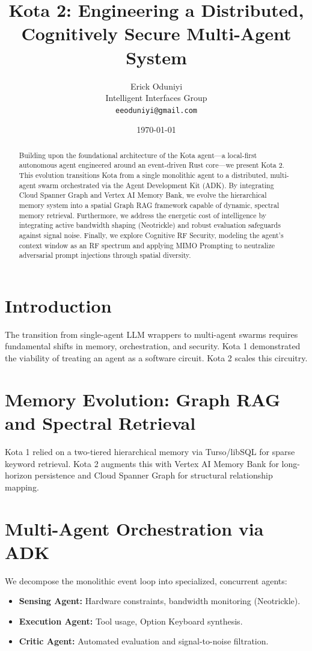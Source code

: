 \documentclass[11pt,a4paper]{article}
\title{\textbf{Kota 2: Engineering a Distributed, Cognitively Secure Multi-Agent System}}
\author{Erick Oduniyi \\ Intelligent Interfaces Group \\ \texttt{eeoduniyi@gmail.com}}
\date{\today}
\begin{document}
\maketitle

\begin{abstract}
Building upon the foundational architecture of the Kota agent---a local-first autonomous agent engineered around an event-driven Rust core---we present Kota 2. This evolution transitions Kota from a single monolithic agent to a distributed, multi-agent swarm orchestrated via the Agent Development Kit (ADK). By integrating Cloud Spanner Graph and Vertex AI Memory Bank, we evolve the hierarchical memory system into a spatial Graph RAG framework capable of dynamic, spectral memory retrieval. Furthermore, we address the energetic cost of intelligence by integrating active bandwidth shaping (Neotrickle) and robust evaluation safeguards against signal noise. Finally, we explore Cognitive RF Security, modeling the agent's context window as an RF spectrum and applying MIMO Prompting to neutralize adversarial prompt injections through spatial diversity.
\end{abstract}

\section{Introduction}
The transition from single-agent LLM wrappers to multi-agent swarms requires fundamental shifts in memory, orchestration, and security. Kota 1 demonstrated the viability of treating an agent as a software circuit. Kota 2 scales this circuitry.

\section{Memory Evolution: Graph RAG and Spectral Retrieval}
Kota 1 relied on a two-tiered hierarchical memory via Turso/libSQL for sparse keyword retrieval. Kota 2 augments this with Vertex AI Memory Bank for long-horizon persistence and Cloud Spanner Graph for structural relationship mapping.

\section{Multi-Agent Orchestration via ADK}
We decompose the monolithic event loop into specialized, concurrent agents:
\begin{itemize}
    \item \textbf{Sensing Agent:} Hardware constraints, bandwidth monitoring (Neotrickle).
    \item \textbf{Execution Agent:} Tool usage, Option Keyboard synthesis.
    \item \textbf{Critic Agent:} Automated evaluation and signal-to-noise filtration.
\end{itemize}
\end{document}
